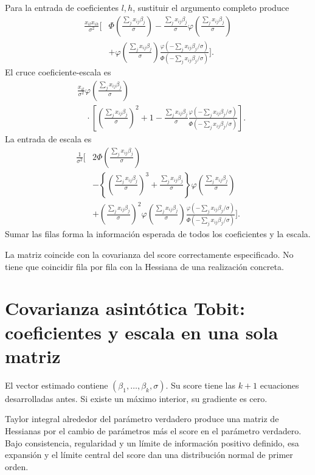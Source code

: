 \documentclass[11pt,a4paper]{article}
\begin{document}
Para la entrada de coeficientes \(l,h\),
sustituir el argumento completo produce
\[
\begin{aligned}
\frac{x_{il}x_{ih}}{\sigma^2}\Bigg[
&\Phi\left(\frac{\sum_jx_{ij}\beta_j}{\sigma}\right)
-\frac{\sum_jx_{ij}\beta_j}{\sigma}
\varphi\left(\frac{\sum_jx_{ij}\beta_j}{\sigma}\right)\\
&+\varphi\left(\frac{\sum_jx_{ij}\beta_j}{\sigma}\right)
\frac{\varphi(-\sum_jx_{ij}\beta_j/\sigma)}
{\Phi(-\sum_jx_{ij}\beta_j/\sigma)}
\Bigg].
\end{aligned}
\]
El cruce coeficiente-escala es
\[
\begin{aligned}
&\frac{x_{il}}{\sigma^2}
\varphi\left(\frac{\sum_jx_{ij}\beta_j}{\sigma}\right)\\
&\quad\cdot\left[
\left(\frac{\sum_jx_{ij}\beta_j}{\sigma}\right)^2+1
-\frac{\sum_jx_{ij}\beta_j}{\sigma}
\frac{\varphi(-\sum_jx_{ij}\beta_j/\sigma)}
{\Phi(-\sum_jx_{ij}\beta_j/\sigma)}\right].
\end{aligned}
\]
La entrada de escala es
\[
\begin{aligned}
\frac1{\sigma^2}\Bigg[&
2\Phi\left(\frac{\sum_jx_{ij}\beta_j}{\sigma}\right)\\
&-\left\{\left(\frac{\sum_jx_{ij}\beta_j}{\sigma}\right)^3
+\frac{\sum_jx_{ij}\beta_j}{\sigma}\right\}
\varphi\left(\frac{\sum_jx_{ij}\beta_j}{\sigma}\right)\\
&+\left(\frac{\sum_jx_{ij}\beta_j}{\sigma}\right)^2
\varphi\left(\frac{\sum_jx_{ij}\beta_j}{\sigma}\right)
\frac{\varphi(-\sum_jx_{ij}\beta_j/\sigma)}
{\Phi(-\sum_jx_{ij}\beta_j/\sigma)}
\Bigg].
\end{aligned}
\]
Sumar las filas forma la
información esperada de todos
los coeficientes y la escala.

La matriz coincide con la
covarianza del score correctamente
especificado. No tiene que coincidir
fila por fila con la
Hessiana de una realización concreta.

\clearpage
\section{Covarianza asintótica Tobit: coeficientes y escala en una sola matriz}\label{unidad102}
El vector estimado contiene
\((\beta_1,\ldots,\beta_k,\sigma)\).
Su score tiene las \(k+1\)
ecuaciones desarrolladas antes.
Si existe un máximo interior,
su gradiente es cero.

Taylor integral alrededor del
parámetro verdadero produce una
matriz de Hessianas por el
cambio de parámetros más el
score en el parámetro verdadero.
Bajo consistencia, regularidad
y un límite de información
positivo definido, esa expansión
y el límite central del score
dan una distribución normal
de primer orden.
\end{document}
